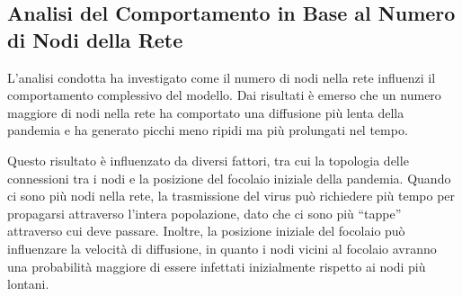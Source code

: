 \subsection{Analisi del Comportamento in Base al Numero di Nodi della Rete}

L'analisi condotta ha investigato come il numero di nodi nella rete 
influenzi il comportamento complessivo del modello. 
Dai risultati è emerso che un numero maggiore di nodi nella rete ha 
comportato una diffusione più lenta della pandemia e ha generato picchi 
meno ripidi ma più prolungati nel tempo.

Questo risultato è influenzato da diversi fattori, tra cui la 
topologia delle connessioni tra i nodi e la posizione del focolaio 
iniziale della pandemia. Quando ci sono più nodi nella rete, 
la trasmissione del virus può richiedere più tempo per propagarsi 
attraverso l'intera popolazione, dato che ci sono più ``tappe'' attraverso 
cui deve passare. Inoltre, la posizione iniziale del focolaio può 
influenzare la velocità di diffusione, in quanto i nodi vicini al 
focolaio avranno una probabilità maggiore di essere infettati 
inizialmente rispetto ai nodi più lontani.

